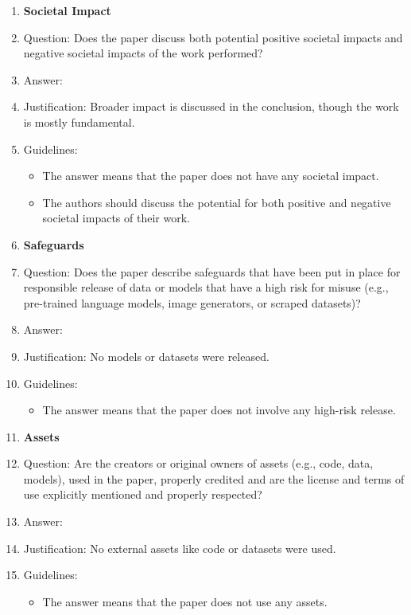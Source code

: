 \begin{enumerate}
\item {\bf Societal Impact}
    \item[] Question: Does the paper discuss both potential positive societal impacts and negative societal impacts of the work performed?
    \item[] Answer: \answerYes{}
    \item[] Justification: Broader impact is discussed in the conclusion, though the work is mostly fundamental.
    \item[] Guidelines:
    \begin{itemize}
        \item The answer \answerNA{} means that the paper does not have any societal impact.
        \item The authors should discuss the potential for both positive and negative societal impacts of their work. 
    \end{itemize}

\item {\bf Safeguards}
    \item[] Question: Does the paper describe safeguards that have been put in place for responsible release of data or models that have a high risk for misuse (e.g., pre-trained language models, image generators, or scraped datasets)?
    \item[] Answer: \answerNA{}
    \item[] Justification: No models or datasets were released.
    \item[] Guidelines:
    \begin{itemize}
        \item The answer \answerNA{} means that the paper does not involve any high-risk release.
    \end{itemize}

\item {\bf Assets}
    \item[] Question: Are the creators or original owners of assets (e.g., code, data, models), used in the paper, properly credited and are the license and terms of use explicitly mentioned and properly respected?
    \item[] Answer: \answerNA{}
    \item[] Justification: No external assets like code or datasets were used.
    \item[] Guidelines:
    \begin{itemize}
        \item The answer \answerNA{} means that the paper does not use any assets.
    \end{itemize}


\end{enumerate}
